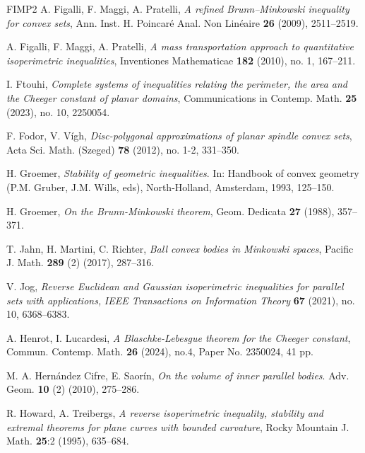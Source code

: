 \documentclass[11pt, oneside]{amsart}
\theoremstyle{theorem}
\theoremstyle{Intro}
\theoremstyle{definition}
\theoremstyle{remark}
\theoremstyle{claim}
\numberwithin{equation}{section}
\begin{document}
\begin{thebibliography}{FIMP2}
A. Figalli, F. Maggi, A. Pratelli, \emph{A refined Brunn--Minkowski inequality for convex sets}, Ann. Inst. H. Poincar\'e Anal. Non Lin\'eaire \textbf{26} (2009), 2511--2519.

  A. Figalli, F. Maggi, A. Pratelli,  \emph{A mass transportation approach to quantitative isoperimetric inequalities}, Inventiones Mathematicae \textbf{182} (2010), no. 1, 167--211.

I. Ftouhi, \emph{Complete systems of inequalities relating the perimeter, the area and the Cheeger constant of planar domains},
Communications in Contemp. Math. \textbf{25} (2023), no. 10, 2250054.

F. Fodor,  V. V\'igh, \emph{Disc-polygonal approximations of planar spindle convex sets}, Acta Sci. Math. (Szeged) {\bf78} (2012), no. 1-2, 331--350.


 H. Groemer, \emph{Stability of geometric inequalities}. In: Handbook of convex geometry (P.M. Gruber, J.M. Wills, eds), North-Holland, Amsterdam, 1993, 125--150.

  H. Groemer, \emph{On the Brunn-Minkowski theorem}, Geom. Dedicata \textbf{27} (1988), 357--371.


 T. Jahn, H. Martini, C. Richter, \emph{Ball convex bodies in Minkowski spaces}, Pacific J. Math. {\bf 289} (2) (2017), 287--316.

V. Jog, \emph{Reverse Euclidean and Gaussian isoperimetric inequalities for parallel sets with applications,} \emph{IEEE Transactions on Information Theory} \textbf{67} (2021), no. 10, 6368--6383.


A. Henrot, I. Lucardesi, \emph{A Blaschke-Lebesgue theorem for the Cheeger constant}, Commun. Contemp. Math. \textbf{26} (2024), no.4, Paper No. 2350024, 41 pp.

M. A. Hern\'andez Cifre, E. Saor\'in, \emph{On the volume of inner parallel bodies}. Adv. Geom.  \textbf{10} (2) (2010),  275--286.


 R. Howard, A. Treibergs, \emph{A reverse isoperimetric inequality, stability and extremal theorems for
plane curves with bounded curvature}, Rocky Mountain J. Math. \textbf{25}:2 (1995), 635--684.
%




\end{thebibliography}
\end{document}
